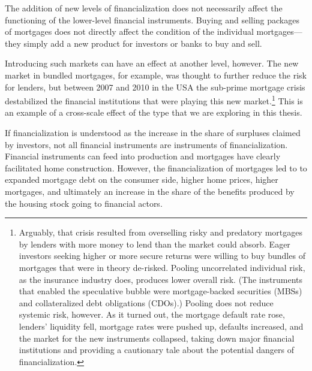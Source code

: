 The addition of new levels of financialization does not necessarily affect the functioning of the lower-level financial instruments. Buying and selling packages of mortgages does not directly affect the condition of the individual mortgages---they simply add a new product for investors or banks to buy and sell. 

Introducing such markets can have an effect at another level, however. The new market in bundled mortgages, for example, was thought to further reduce the risk for lenders, but between 2007 and 2010 in the USA the sub-prime mortgage crisis destabilized the financial institutions that were playing this new market.\footnote{Arguably, that crisis resulted from overselling risky and predatory mortgages by lenders with more money to lend than the market could absorb. Eager investors seeking higher or more secure returns were willing to buy bundles of mortgages that were in theory de-risked. Pooling uncorrelated individual risk, as the insurance industry does, produces lower overall risk. (The instruments that enabled the speculative bubble were mortgage-backed securities (MBSs) and collateralized debt obligations (CDOs).) Pooling does not reduce systemic risk, however. As it turned out, the mortgage default rate rose, lenders' liquidity fell, mortgage rates were pushed up, defaults increased, and the market for the new instruments collapsed, taking down major financial institutions and providing a cautionary tale about the potential dangers of financialization.} 
This is an example of a cross-scale effect of the type that we are exploring in this thesis.  



If financialization is understood as the increase in the share of surpluses claimed by investors, not all financial instruments are instruments of financialization. Financial instruments can feed into production and mortgages have clearly facilitated home construction. However, the financialization of mortgages led to to expanded mortgage debt on the consumer side, higher home prices, higher mortgages, and ultimately an increase in the share of the benefits produced by the housing stock going to financial actors. 


